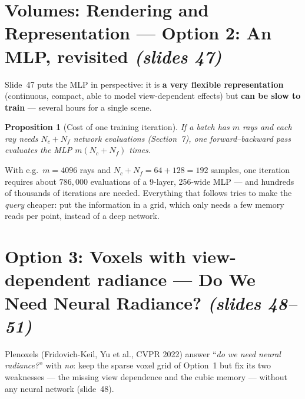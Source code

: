 \documentclass[11pt,a4paper]{article}
\newcommand{\sref}[1]{\texorpdfstring{\emph{(slides #1)}}{(slides #1)}}
\theoremstyle{definition}
\theoremstyle{plain}
\newtheorem{proposition}[definition]{Proposition}
\theoremstyle{remark}
\begin{document}


\section{Volumes: Rendering and Representation --- Option 2: An MLP, revisited \sref{47}}

Slide~47 puts the MLP in perspective: it is \textbf{a very flexible representation} (continuous, compact, able to model view-dependent effects) but \textbf{can be slow to train} --- several hours for a single scene.

\begin{proposition}[Cost of one training iteration]
If a batch has $m$ rays and each ray needs $N_c+N_f$ network evaluations (Section~7), one forward--backward pass evaluates the MLP $m(N_c+N_f)$ times. 
\end{proposition}
\begin{intuition}
With e.g.\ $m=4096$ rays and $N_c+N_f=64+128=192$ samples, one iteration requires about $786{,}000$ evaluations of a 9-layer, 256-wide MLP --- and hundreds of thousands of iterations are needed. Everything that follows tries to make the \emph{query} cheaper: put the information in a grid, which only needs a few memory reads per point, instead of a deep network.
\end{intuition}

\section{Option 3: Voxels with view-dependent radiance --- Do We Need Neural Radiance? \sref{48--51}}

Plenoxels (Fridovich-Keil, Yu et al., CVPR 2022) answer ``\emph{do we need neural radiance?}'' with \emph{no}: keep the sparse voxel grid of Option~1 but fix its two weaknesses --- the missing view dependence and the cubic memory --- without any neural network (slide~48).
\end{document}
